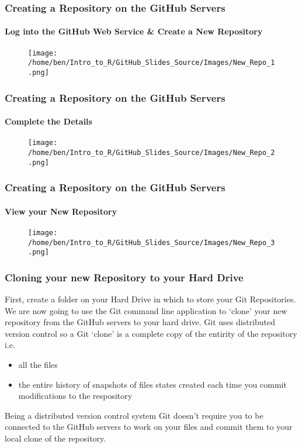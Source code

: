 \documentclass[xcolor=dvipsnames]{beamer}
\begin{document}
\begin{frame}
\frametitle{Creating a Repository on the GitHub Servers}
\framesubtitle{Log into the GitHub Web Service \& Create a New Repository}
\begin{center}
\begin{figure}
\texttt{[image: /home/ben/Intro\_to\_R/GitHub\_Slides\_Source/Images/New\_Repo\_1.png]}
\end{figure}
\end{center}
\end{frame}

\begin{frame}
\frametitle{Creating a Repository on the GitHub Servers}
\framesubtitle{Complete the Details}
\begin{center}
\begin{figure}
\texttt{[image: /home/ben/Intro\_to\_R/GitHub\_Slides\_Source/Images/New\_Repo\_2.png]}
\end{figure}
\end{center}
\end{frame}

\begin{frame}
\frametitle{Creating a Repository on the GitHub Servers}
\framesubtitle{View your New Repository}
\begin{center}
\begin{figure}
\texttt{[image: /home/ben/Intro\_to\_R/GitHub\_Slides\_Source/Images/New\_Repo\_3.png]}
\end{figure}
\end{center}
\end{frame}

\begin{frame}
\frametitle{Cloning your new Repository to your Hard Drive}

First, create a folder on your Hard Drive in which to store your Git Repositories.  
\newline
\newline
We are now going to use the Git command line application to `clone' your new repository from the GitHub servers to your hard drive.
\newline
\newline
Git uses distributed version control so a Git `clone' is a complete copy of the entirity of the repository i.e.\begin{itemize}
\item all the files
\item the entire history of snapshots of files states created each time you commit modifications to the respository
\newline \end{itemize}
Being a distributed version control system Git doesn't require you to be connected to the GitHub servers to work on your files and commit them to your local clone of the repository.

\end{frame}
\end{document}
